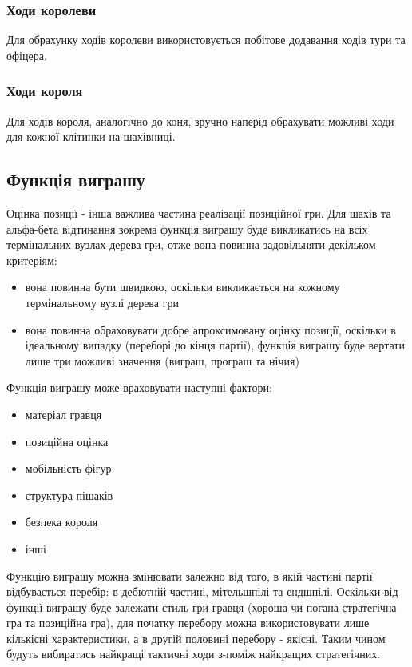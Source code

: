\documentclass[12pt,a4paper]{article}
\begin{document}
\subsubsection{Ходи королеви}

Для обрахунку ходів королеви використовується побітове додавання ходів тури та
офіцера.

\subsubsection{Ходи короля}

Для ходів короля, аналогічно до коня, зручно наперід обрахувати можливі ходи
для кожної клітинки на шахівниці.

\subsection{Функція виграшу}

Оцінка позиції - інша важлива частина реалізації позиційної гри. Для шахів та
альфа-бета відтинання зокрема функція виграшу буде викликатись на всіх
термінальних вузлах дерева гри, отже вона повинна задовільняти декільком
критеріям:
\begin{itemize}
\item вона повинна бути швидкою, оскільки викликається на кожному
  термінальному вузлі дерева гри
\item вона повинна обраховувати добре апроксимовану оцінку позиції, оскільки в
  ідеальному випадку (переборі до кінця партії), функція виграшу буде вертати
  лише три можливі значення (виграш, програш та нічия)
\end{itemize}

Функція виграшу може враховувати наступні фактори:

\begin{itemize}
\item матеріал гравця
\item позиційна оцінка
\item мобільність фігур
\item структура пішаків
\item безпека короля
\item інші
\end{itemize}

Функцію виграшу можна змінювати залежно від того, в якій частині партії
відбувається перебір: в дебютній частині, мітельшпілі та ендшпілі. Оскільки
від функції виграшу буде залежати стиль гри гравця (хороша чи погана стратегічна
гра та позиційна гра), для початку перебору можна використовувати лише
кількісні характеристики, а в другій половині перебору - якісні. Таким чином
будуть вибиратись найкращі тактичні ходи з-поміж найкращих стратегічних.
\end{document}
